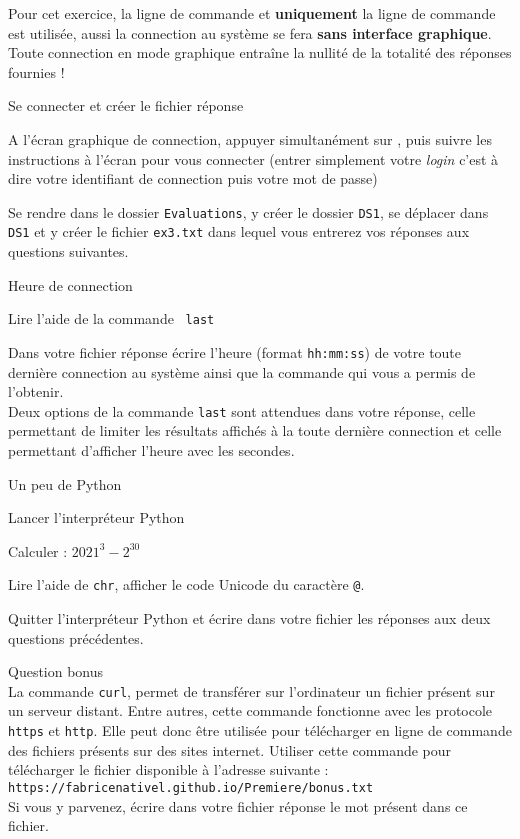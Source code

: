 \documentclass[11pt,a4paper]{article}
\begin{document}
\begin{tcolorbox}[title=\textcolor{black}{\danger \; Attention !},colbacktitle=lightgray]
     Pour cet exercice, la ligne de commande et \textbf{uniquement} la ligne de commande est utilisée, aussi la connection au système se fera \textbf{sans interface graphique}. Toute connection en mode graphique entraîne la nullité de la totalité des réponses fournies !
\end{tcolorbox}
\QListe
    \item Se connecter et créer le fichier réponse
\SQListe
\item A l'écran graphique de connection, appuyer simultanément sur , puis suivre les instructions à l'écran pour vous connecter (entrer simplement votre \textit{login} c'est à dire votre identifiant de connection puis votre mot de passe)
\item Se rendre dans le dossier {\tt Evaluations}, y créer le dossier {\tt DS1}, se déplacer dans {\tt DS1} et y créer le fichier {\tt ex3.txt} dans lequel vous entrerez vos réponses aux questions suivantes.
\FinListe
    \item Heure de connection
\SQListe
\item Lire l'aide de la commande  {\tt last}
\item Dans votre fichier réponse écrire l'heure (format {\tt hh:mm:ss}) de votre toute dernière connection au système ainsi que la commande qui vous a permis de l'obtenir.\\
    \aide \; Deux options de la commande {\tt last} sont attendues dans votre réponse, celle permettant de limiter les résultats affichés à la toute dernière connection et celle permettant d'afficher l'heure avec les secondes.
\FinListe
    \item Un peu de Python
\SQListe
    \item Lancer l'interpréteur Python
    \item Calculer : $ 2021^{3}-2^{30}$
    \item Lire l'aide de {\tt chr}, afficher le code Unicode du caractère {\tt @}.
    \item Quitter l'interpréteur Python et écrire dans votre fichier les réponses aux deux questions précédentes.
\FinListe
\item Question bonus \\
La commande {\tt curl}, permet de transférer sur l'ordinateur un fichier présent sur un serveur distant. Entre autres, cette commande fonctionne avec les protocole {\tt https} et {\tt http}. Elle peut donc être utilisée pour télécharger en ligne de commande des fichiers présents sur des sites internet.
Utiliser cette commande pour télécharger le fichier disponible à l'adresse suivante : \\
{\tt https://fabricenativel.github.io/Premiere/bonus.txt}\\
Si vous y parvenez, écrire dans votre fichier réponse le mot présent dans ce fichier.
\end{document}
